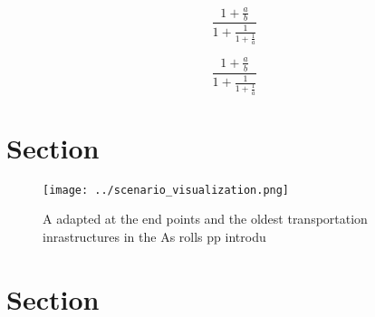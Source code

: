\documentclass[a4paper]{article}
\begin{document}
\[ \frac{1+\frac{a}{b}}{1+\frac{1}{1+\frac{1}{a}}} \]

\[ \frac{1+\frac{a}{b}}{1+\frac{1}{1+\frac{1}{a}}} \]

\section{Section}

\begin{figure}
\centering
\texttt{[image: ../scenario\_visualization.png]}
\caption{A adapted at the end points and the oldest transportation inrastructures in the As rolls pp introdu
}
\end{figure}
 
\section{Section}
\end{document}
